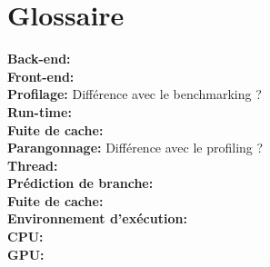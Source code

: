 \documentclass[10pt]{report}
\begin{document}
\chapter*{Glossaire}
\noindent
\textbf{Back-end:}\\ 
\textbf{Front-end:}\\
\textbf{Profilage:} Différence avec le benchmarking ?\\
\textbf{Run-time:}\\
\textbf{Fuite de cache:}\\
\textbf{Parangonnage:} Différence avec le profiling ?\\
\textbf{Thread:}\\
\textbf{Prédiction de branche:}\\
\textbf{Fuite de cache:}\\
\textbf{Environnement d'exécution:}\\
\textbf{CPU:}\\
\textbf{GPU:}\\


\end{document}
